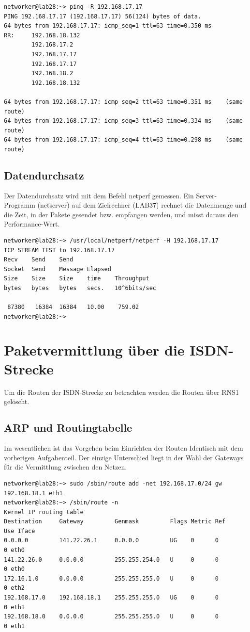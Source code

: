 \newpage
\begin{lstlisting}[label=pingRknoten,caption=ping -R Konsolenausgabe]
networker@lab28:~> ping -R 192.168.17.17
PING 192.168.17.17 (192.168.17.17) 56(124) bytes of data.
64 bytes from 192.168.17.17: icmp_seq=1 ttl=63 time=0.350 ms
RR:     192.168.18.132
        192.168.17.2
        192.168.17.17
        192.168.17.17
        192.168.18.2
        192.168.18.132

64 bytes from 192.168.17.17: icmp_seq=2 ttl=63 time=0.351 ms    (same route)
64 bytes from 192.168.17.17: icmp_seq=3 ttl=63 time=0.334 ms    (same route)
64 bytes from 192.168.17.17: icmp_seq=4 ttl=63 time=0.298 ms    (same route)
\end{lstlisting}
\subsection{Datendurchsatz}
Der Datendurchsatz wird mit dem Befehl netperf gemessen. Ein Server-Programm (netserver) auf dem Zielrechner (LAB37) rechnet die Datenmenge und die Zeit, in der Pakete gesendet bzw. empfangen werden, und misst daraus den Performance-Wert.
\begin{lstlisting}[label=netperfknoten,caption=Datendurchsatz]
networker@lab28:~> /usr/local/netperf/netperf -H 192.168.17.17
TCP STREAM TEST to 192.168.17.17
Recv	Send	Send	
Socket	Send	Message	Elapsed
Size	Size	Size	time	Throughput
bytes 	bytes	bytes	secs.	10^6bits/sec

 87380	 16384	16384	10.00	 759.02
networker@lab28:~>
\end{lstlisting}

\newpage
\section{Paketvermittlung über die ISDN-Strecke}
Um die Routen der ISDN-Strecke zu betrachten werden die Routen über RNS1 gelöscht.
\subsection{ARP und Routingtabelle}
Im wesentlichen ist das Vorgehen beim Einrichten der Routen Identisch mit dem vorherigen Aufgabenteil. Der einzige Unterschied liegt in der Wahl der Gateways für die Vermittlung zwischen den Netzen.
\begin{lstlisting}[label=arbeitsRechnerISDN,caption=Konfigurierte Routen auf LAB28]
networker@lab28:~> sudo /sbin/route add -net 192.168.17.0/24 gw 192.168.18.1 eth1
networker@lab28:~> /sbin/route -n
Kernel IP routing table
Destination     Gateway         Genmask         Flags Metric Ref    Use Iface
0.0.0.0         141.22.26.1     0.0.0.0         UG    0      0        0 eth0
141.22.26.0     0.0.0.0         255.255.254.0   U     0      0        0 eth0
172.16.1.0      0.0.0.0         255.255.255.0   U     0      0        0 eth2
192.168.17.0    192.168.18.1    255.255.255.0   UG    0      0        0 eth1
192.168.18.0    0.0.0.0         255.255.255.0   U     0      0        0 eth1
\end{lstlisting}

